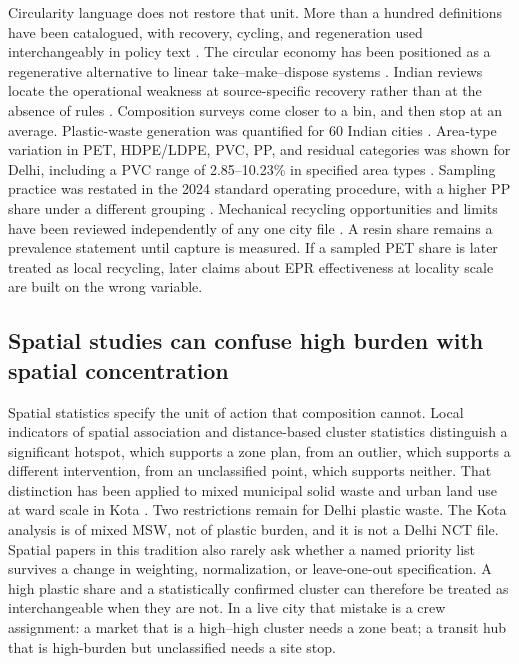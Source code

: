 \documentclass[12pt,a4paper]{article}
\begin{document}
Circularity language does not restore that unit. More than a hundred definitions have been catalogued, with recovery, cycling, and regeneration used interchangeably in policy text \citep{kirchherr_ce_2017}. The circular economy has been positioned as a regenerative alternative to linear take--make--dispose systems \citep{geissdoerfer_ce_2017}. Indian reviews locate the operational weakness at source-specific recovery rather than at the absence of rules \citep{haque_plastic_waste_india_2022,csiro_ce_policy_india_2021}. Composition surveys come closer to a bin, and then stop at an average. Plastic-waste generation was quantified for 60 Indian cities \citep{cpcb_60cities_2015}. Area-type variation in PET, HDPE/LDPE, PVC, PP, and residual categories was shown for Delhi, including a PVC range of 2.85--10.23\% in specified area types \citep{delhi_plastic_characterization_study}. Sampling practice was restated in the 2024 standard operating procedure, with a higher PP share under a different grouping \citep{cpcb_sop_pwm_2024}. Mechanical recycling opportunities and limits have been reviewed independently of any one city file \citep{hopewell_recycling_2009}. A resin share remains a prevalence statement until capture is measured. If a sampled PET share is later treated as local recycling, later claims about EPR effectiveness at locality scale are built on the wrong variable.

\subsection{Spatial studies can confuse high burden with spatial concentration}

Spatial statistics specify the unit of action that composition cannot. Local indicators of spatial association \citep{anselin_lisa_1995} and distance-based cluster statistics \citep{getis_ord_1992} distinguish a significant hotspot, which supports a zone plan, from an outlier, which supports a different intervention, from an unclassified point, which supports neither. That distinction has been applied to mixed municipal solid waste and urban land use at ward scale in Kota \citep{ieam_kota_landuse_msw_2026}. Two restrictions remain for Delhi plastic waste. The Kota analysis is of mixed MSW, not of plastic burden, and it is not a Delhi NCT file. Spatial papers in this tradition also rarely ask whether a named priority list survives a change in weighting, normalization, or leave-one-out specification. A high plastic share and a statistically confirmed cluster can therefore be treated as interchangeable when they are not. In a live city that mistake is a crew assignment: a market that is a high--high cluster needs a zone beat; a transit hub that is high-burden but unclassified needs a site stop.
\end{document}
